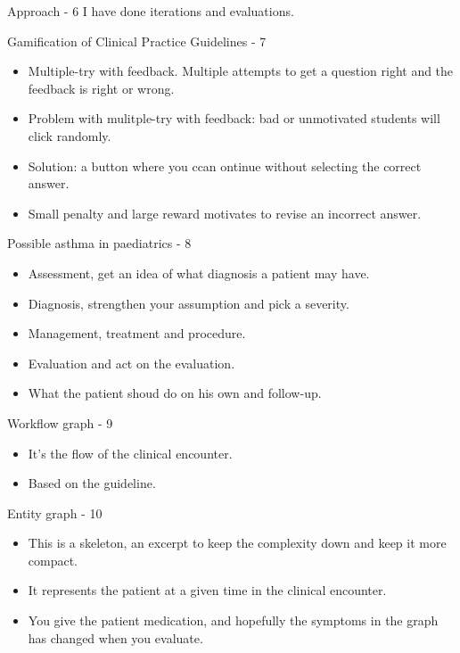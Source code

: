 \documentclass{beamer}
\begin{document}
\begin{frame}{Approach - 6}
I have done iterations and evaluations.
\end{frame}


\begin{frame}{Gamification of Clinical Practice Guidelines - 7}
\begin{itemize}
	\item Multiple-try with feedback. Multiple attempts to get a question right and the feedback is right or wrong.
	\item Problem with mulitple-try  with feedback: bad or unmotivated students will click randomly.
	\item Solution: a button where you ccan ontinue without selecting the correct answer.
	\item Small penalty and large reward motivates to revise an incorrect answer.
\end{itemize}
\end{frame}

\begin{frame}{Possible asthma in paediatrics - 8}
\begin{itemize}
	\item Assessment, get an idea of what diagnosis a patient may have.
	\item Diagnosis, strengthen your assumption and pick a severity.
	\item Management, treatment and procedure.
	\item Evaluation and act on the evaluation.
	\item What the patient shoud do on his own and follow-up.
\end{itemize}
\end{frame}

\begin{frame}{Workflow graph - 9}
\begin{itemize}
	\item It's the flow of the clinical encounter.
	\item Based on the guideline.
\end{itemize}
\end{frame}

\begin{frame}{Entity graph - 10}
\begin{itemize}
	\item This is a skeleton, an excerpt to keep the complexity down and keep it more compact.
	\item It represents the patient at a given time in the clinical encounter.
	\item You give the patient medication, and hopefully the symptoms in the graph has changed when you evaluate.
\end{itemize}
\end{frame}
\end{document}
